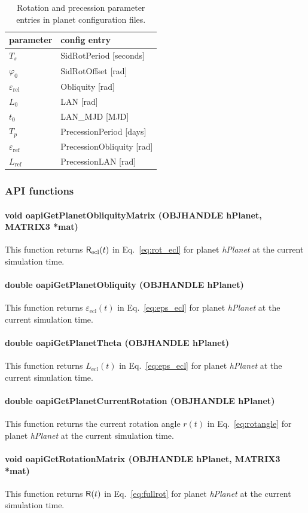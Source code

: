 \documentclass[Orbiter Technical Reference.tex]{subfiles}
\begin{document}
\begin{table}[h]
\begin{tabular}{ll}
parameter & config entry \\ \hline
$T_s$ & SidRotPeriod [seconds] \\
$\varphi_0$ & SidRotOffset [rad] \\
$\varepsilon_\mathrm{rel}$ & Obliquity [rad] \\
$L_0$ & LAN [rad] \\
$t_0$ & LAN\_MJD [MJD] \\
$T_p$ & PrecessionPeriod [days] \\
$\varepsilon_\mathrm{ref}$ & PrecessionObliquity [rad] \\
$L_\mathrm{ref}$ & PrecessionLAN [rad]
\end{tabular}
\caption{Rotation and precession parameter entries in planet configuration files.}
\label{tab:param}
\end{table}

\subsubsection{API functions}
\paragraph{void oapiGetPlanetObliquityMatrix (OBJHANDLE hPlanet, MATRIX3 *mat)}
This function returns $\mathsf{R}_\mathrm{ecl}(t)$ in Eq.~\ref{eq:rot_ecl} for planet \emph{hPlanet} at the current simulation time.

\paragraph{double oapiGetPlanetObliquity (OBJHANDLE hPlanet)}
This function returns $\varepsilon_\mathrm{ecl}(t)$ in Eq.~\ref{eq:eps_ecl} for planet \emph{hPlanet} at the current simulation time.

\paragraph{double oapiGetPlanetTheta (OBJHANDLE hPlanet)}
This function returns $L_\mathrm{ecl}(t)$ in Eq.~\ref{eq:eps_ecl} for planet \emph{hPlanet} at the current simulation time.

\paragraph{double oapiGetPlanetCurrentRotation (OBJHANDLE hPlanet)}
This function returns the current rotation angle $r(t)$ in Eq.~\ref{eq:rotangle} for planet \emph{hPlanet} at the current simulation time.

\paragraph{void oapiGetRotationMatrix (OBJHANDLE hPlanet, MATRIX3 *mat)}
This function returns $\mathsf{R}(t)$ in Eq.~\ref{eq:fullrot} for planet \emph{hPlanet} at the current simulation time.
\end{document}
